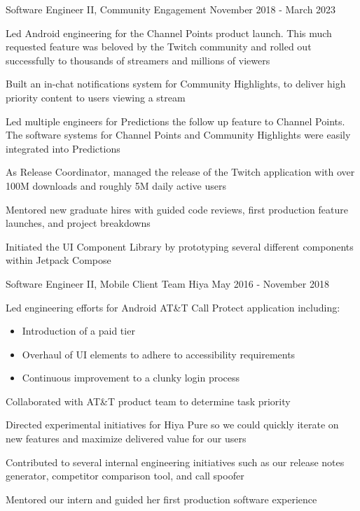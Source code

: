 \begin{cventries}
  \cventry
    {Software Engineer II, Community Engagement} %
    {} %
    {} %
    {November 2018 - March 2023} %
    {
    \begin{cvitems} %
    \item Led Android engineering for the Channel Points product launch. This much requested feature was beloved by the Twitch community and rolled out successfully to thousands of streamers and millions of viewers 
    \item Built an in-chat notifications system for Community Highlights, to deliver high priority content to users viewing a stream
    \item Led multiple engineers for Predictions the follow up feature to Channel Points. The software systems for Channel Points and Community Highlights were easily integrated into Predictions
    \item As Release Coordinator, managed the release of the Twitch application with over 100M downloads and roughly 5M daily active users
    \item Mentored new graduate hires with guided code reviews, first production feature launches, and project breakdowns
    \item Initiated the UI Component Library by prototyping several different components within Jetpack Compose
    \end{cvitems}
    }

 \cventry
    {Software Engineer II, Mobile Client Team} %
    {Hiya} %
    {} %
    {May 2016 - November 2018} %
    {
    \begin{cvitems} %
    \item { Led engineering efforts for Android AT\&T Call Protect application including:
        \begin{itemize}
            \item Introduction of a paid tier
            \item Overhaul of UI elements to adhere to accessibility requirements
            \item Continuous improvement to a clunky login process
        \end{itemize}}
    \item Collaborated with AT\&T product team to determine task priority
    \item Directed experimental initiatives for Hiya Pure so we could quickly iterate on new features and maximize delivered value for our users
    \item Contributed to several internal engineering initiatives such as our release notes generator, competitor comparison tool, and call spoofer
    \item Mentored our intern and guided her first production software experience
    \end{cvitems}
    }


\end{cventries}

